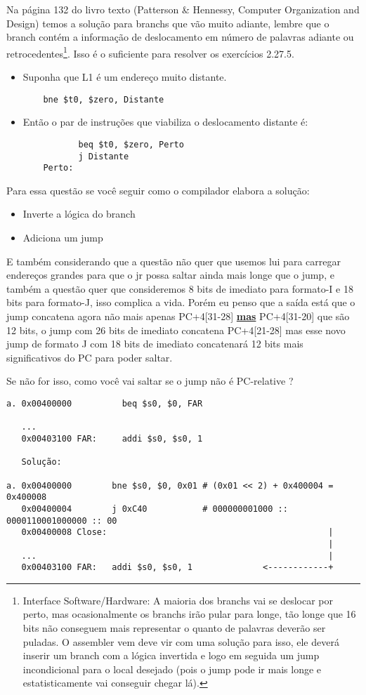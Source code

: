 \documentclass{article}
\begin{document}
Na página 132 do livro texto (Patterson \& Hennessy, Computer Organization and
Design) temos a solução para branchs que vão muito adiante, lembre que o branch
contém a informação de deslocamento em número de palavras adiante ou
retrocedentes\footnote{Interface Software/Hardware: A maioria dos branchs vai se
deslocar por perto, mas ocasionalmente os branchs irão pular para longe, tão
longe que 16 bits não conseguem mais representar o quanto de palavras deverão
ser puladas. O assembler vem deve vir com uma solução para isso, ele deverá
inserir um branch com a lógica invertida e logo em seguida um jump incondicional
para o local desejado (pois o jump pode ir mais longe e estatisticamente vai
conseguir chegar lá).}. Isso é o suficiente para resolver os exercícios 2.27.5.

\begin{itemize}
\item Suponha que L1 é um endereço muito distante.
  \begin{verbatim}
    bne $t0, $zero, Distante
  \end{verbatim}
\item Então o par de instruções que viabiliza o deslocamento distante é:
  \begin{verbatim}
           beq $t0, $zero, Perto
           j Distante
    Perto:
  \end{verbatim}
\end{itemize}

Para essa questão se você seguir como o compilador elabora a solução:
\begin{itemize}
\item Inverte a lógica do branch
\item Adiciona um jump
\end{itemize}

E também considerando que a questão não quer que usemos lui para carregar
endereços grandes para que o jr possa saltar ainda mais longe que o jump, e
também a questão quer que consideremos 8 bits de imediato para formato-I e 18
bits para formato-J, isso complica a vida. Porém eu penso que a saída está que o
jump concatena agora não mais apenas PC+4[31-28] \underline{\textbf{mas}}
PC+4[31-20] que são 12 bits, o jump com 26 bits de imediato concatena
PC+4[21-28] mas esse novo jump de formato J com 18 bits de imediato concatenará
12 bits mais significativos do PC para poder saltar.

Se não for isso, como você vai saltar se o jump não é PC-relative ?

\begin{verbatim}
a. 0x00400000          beq $s0, $0, FAR

   ...
   0x00403100 FAR:     addi $s0, $s0, 1

   Solução:

a. 0x00400000        bne $s0, $0, 0x01 # (0x01 << 2) + 0x400004 = 0x400008
   0x00400004        j 0xC40           # 000000001000 :: 0000110001000000 :: 00
   0x00400008 Close:                                            |
                                                                |
   ...                                                          |
   0x00403100 FAR:   addi $s0, $s0, 1              <------------+
\end{verbatim}
\end{document}
